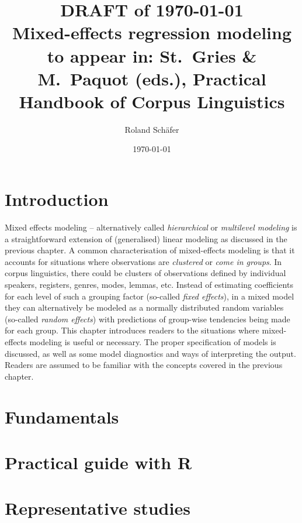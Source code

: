 \documentclass[a4paper,12pt]{article}
\title{{\small DRAFT of \today}\\Mixed-effects regression modeling\\\small to appear in: St.~Gries \& M.~Paquot (eds.), Practical Handbook of Corpus Linguistics}
\author{Roland Schäfer}
\affil{Freie Universität Berlin}
\date{\today}
\begin{document}
       

\maketitle

\section{Introduction}
\label{sec:introduction}

Mixed effects modeling -- alternatively called \textit{hierarchical} or \textit{multilevel modeling} is a straightforward extension of (generalised) linear modeling as discussed in the previous chapter.
A common characterisation of mixed-effects modeling is that it accounts for situations where observations are \textit{clustered} or \textit{come in groups}.
In corpus linguistics, there could be clusters of observations defined by individual speakers, registers, genres, modes, lemmas, etc.
Instead of estimating coefficients for each level of such a grouping factor (so-called \textit{fixed effects}), in a mixed model they can alternatively be modeled as a normally distributed random variables (so-called \textit{random effects}) with predictions of group-wise tendencies being made for each group.
This chapter introduces readers to the situations where mixed-effects modeling is useful or necessary.
The proper specification of models is discussed, as well as some model diagnostics and ways of interpreting the output.
Readers are assumed to be familiar with the concepts covered in the previous chapter.

\section{Fundamentals}
\label{sec:fundamentals}


\section{Practical guide with R}


\section{Representative studies}
\end{document}
